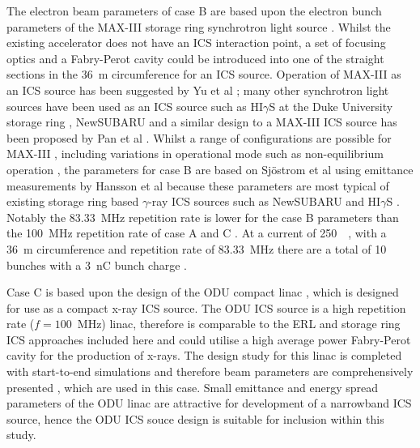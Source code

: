 \documentclass[../main.tex]{subfiles}
\begin{document}
The electron beam parameters of case B are based upon the electron bunch parameters of the MAX-III storage ring synchrotron light source \cite{sjostrom2009max,hansson2011imaging,rosborg2012electron}. Whilst the existing accelerator does not have an ICS interaction point, a set of focusing optics and a Fabry-Perot cavity could be introduced into one of the straight sections in the 36~\si{\metre} circumference for an ICS source. Operation of MAX-III as an ICS source has been suggested by Yu et al \cite{yu2009lattice,owen2013nonequilibrium}; many other synchrotron light sources have been used as an ICS source such as HI$\gamma$S at the Duke University storage ring \cite{weller2009research}, NewSUBARU \cite{utsunomiya2015gamma} and a similar design to a MAX-III ICS source has been proposed by Pan et al \cite{pan2019design}. Whilst a range of configurations are possible for MAX-III \cite{sjostrom2009max}, including variations in operational mode such as non-equilibrium operation \cite{owen2012modular}, the parameters for case B are based on Sj\"{o}strom et al \cite{sjostrom2009max} using emittance measurements by Hansson et al \cite{hansson2011imaging} because these parameters are most typical of existing storage ring based $\gamma$-ray ICS sources such as NewSUBARU \cite{utsunomiya2015gamma} and HI$\gamma$S \cite{weller2009research}. Notably the 83.33~\si{\mega\hertz} repetition rate is lower for the case B parameters than the 100~\si{\mega\hertz} repetition rate of case A and C \cite{sjostrom2009max,rosborg2012electron}. At a current of 250~\si{\milli\amperes}, with a 36~\si{\meter} circumference and repetition rate of 83.33~\si{\mega\hertz} \cite{sjostrom2009max,rosborg2012electron} there are a total of 10 bunches with a 3~\si{\nano\coulomb} bunch charge .

Case C is based upon the design of the ODU compact linac \cite{krafft2016laser,deitrick2017inverse,deitrick2018high}, which is designed for use as a compact x-ray ICS source. The ODU ICS source is a high repetition rate ($f = 100$~\si{\mega\hertz}) linac, therefore is comparable to the ERL and storage ring ICS approaches included here and could utilise a high average power Fabry-Perot cavity for the production of x-rays. The design study for this linac is completed with start-to-end simulations and therefore beam parameters are comprehensively presented \cite{deitrick2017inverse,deitrick2018high}, which are used in this case. Small emittance and energy spread parameters of the ODU linac are attractive for development of a narrowband ICS source, hence the ODU ICS souce design is suitable for inclusion within this study.  
\end{document}
